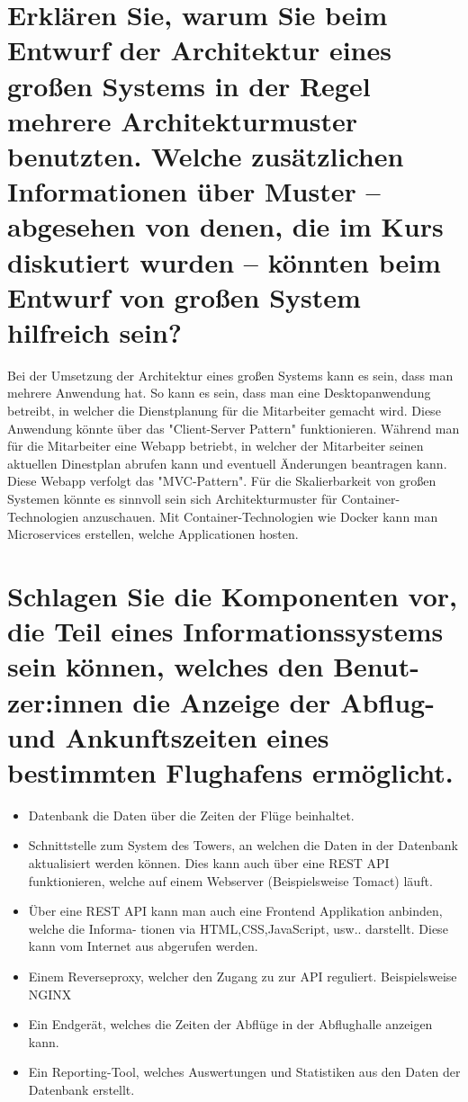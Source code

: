\documentclass[12pt]{article}
\begin{document}
\section{Erklären Sie, warum Sie beim Entwurf der Architektur eines großen Systems in der Regel mehrere Architekturmuster benutzten. Welche zusätzlichen Informationen über Muster – abgesehen von denen, die im
Kurs diskutiert wurden – könnten beim Entwurf von großen System hilfreich sein?}
Bei der Umsetzung der Architektur eines großen Systems kann es sein, dass man mehrere Anwendung hat. So kann es sein, dass man eine Desktopanwendung betreibt, in welcher die Dienstplanung für die Mitarbeiter gemacht wird. Diese Anwendung könnte über das "Client-Server Pattern" funktionieren. Während man für die Mitarbeiter eine Webapp betriebt, in welcher der Mitarbeiter seinen aktuellen Dinestplan abrufen kann und eventuell Änderungen beantragen kann. Diese Webapp verfolgt das "MVC-Pattern". Für die Skalierbarkeit von großen Systemen könnte es sinnvoll sein sich Architekturmuster für Container-Technologien anzuschauen. Mit Container-Technologien wie Docker kann man Microservices erstellen, welche Applicationen hosten.
\section{Schlagen Sie die Komponenten vor, die Teil eines Informationssystems sein können, welches den Benut-
zer:innen die Anzeige der Abflug- und Ankunftszeiten eines bestimmten Flughafens ermöglicht.}
\begin{itemize}
 \item Datenbank die Daten über die Zeiten der Flüge beinhaltet.
 \item Schnittstelle zum System des Towers, an welchen die Daten in der Datenbank aktualisiert werden können. Dies kann auch über eine REST API funktionieren, welche auf einem Webserver (Beispielsweise Tomact) läuft.
 \item Über eine REST API kann man auch eine Frontend Applikation anbinden, welche die Informa- tionen via HTML,CSS,JavaScript, usw.. darstellt. Diese kann vom Internet aus abgerufen werden.
 \item Einem Reverseproxy, welcher den Zugang zu zur API reguliert. Beispielsweise NGINX
 \item Ein Endgerät, welches die Zeiten der Abflüge in der Abflughalle anzeigen kann.
 \item Ein Reporting-Tool, welches Auswertungen und Statistiken aus den Daten der Datenbank erstellt.
\end{itemize}
\pagebreak
\end{document}

